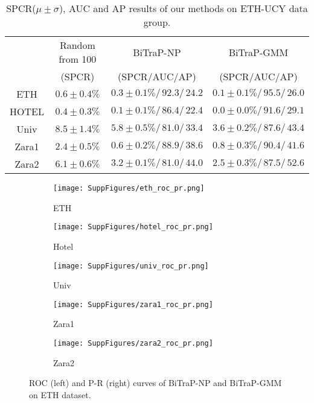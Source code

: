 \documentclass[letterpaper, 10 pt, conference]{ieeeconf}
\begin{document}
\begin{table}[h]
    \centering
        \caption{SPCR($\mu\pm\sigma$), AUC and AP results of our methods on ETH-UCY data group.}
        \resizebox{.49 \textwidth}{!} {
    \begin{tabular}{c|c|c|c}
        \toprule
         & Random from 100 & BiTraP-NP & BiTraP-GMM \\
         & (SPCR) & (SPCR/AUC/AP) & (SPCR/AUC/AP) \\
        \midrule
        ETH & $0.6\pm0.4\%$ & $0.3\pm0.1\%/\,92.3/\,24.2$& $\mathbf{0.1\pm0.1\%}/\,\mathbf{95.5}/\,\mathbf{26.0}$ \\
        HOTEL & $0.4\pm0.3\%$ & $0.1\pm0.1\%/\,86.4/\,22.4$ & $\mathbf{0.0\pm0.0\%}/\,\mathbf{91.6}/\,\mathbf{29.1}$ \\
        Univ & $8.5\pm1.4\%$ & $5.8\pm0.5\%/\,81.0/\,33.4$ & $\mathbf{3.6\pm0.2\%}/\,\mathbf{87.6}/\,\mathbf{43.4}$ \\
        Zara1 & $2.4\pm0.5\%$ & $\mathbf{0.6\pm0.2\%}/\,88.9/\,38.6$ & $0.8\pm0.3\%/\,\mathbf{90.4}/\,\mathbf{41.6}$ \\
        Zara2 & $6.1\pm0.6\%$ & $3.2\pm0.1\%/\,81.0/\,44.0$ & $\mathbf{2.5\pm0.3\%}/\,\mathbf{87.5}/\,\mathbf{52.6}$ \\
        \bottomrule
    \end{tabular}}
    \label{tab:spcr_auc_ap}
\end{table}



\begin{figure}[h!]
    \begin{subfigure}[h]{0.48\textwidth}
        \texttt{[image: SuppFigures/eth\_roc\_pr.png]}
        \caption{ETH}
        \label{fig:eth_roc_pr}
    \end{subfigure}
    \begin{subfigure}[h]{0.48\textwidth}
        \texttt{[image: SuppFigures/hotel\_roc\_pr.png]}
        \caption{Hotel}
        \label{fig:hotel_roc_pr}
    \end{subfigure}
    
    \begin{subfigure}[h]{0.48\textwidth}
        \texttt{[image: SuppFigures/univ\_roc\_pr.png]}
        \caption{Univ}
        \label{fig:univ_roc_pr}
    \end{subfigure}
    \begin{subfigure}[h]{0.48\textwidth}
        \texttt{[image: SuppFigures/zara1\_roc\_pr.png]}
        \caption{Zara1}
        \label{fig:zara1_roc_pr}
    \end{subfigure}
    
    \begin{subfigure}[h]{0.48\textwidth}
        \texttt{[image: SuppFigures/zara2\_roc\_pr.png]}
        \caption{Zara2}
        \label{fig:zara2_roc_pr}
    \end{subfigure}
    \caption{ROC (left) and P-R (right) curves of BiTraP-NP and BiTraP-GMM on ETH dataset.}
    \label{fig:roc_pr}
\end{figure}
\end{document}
